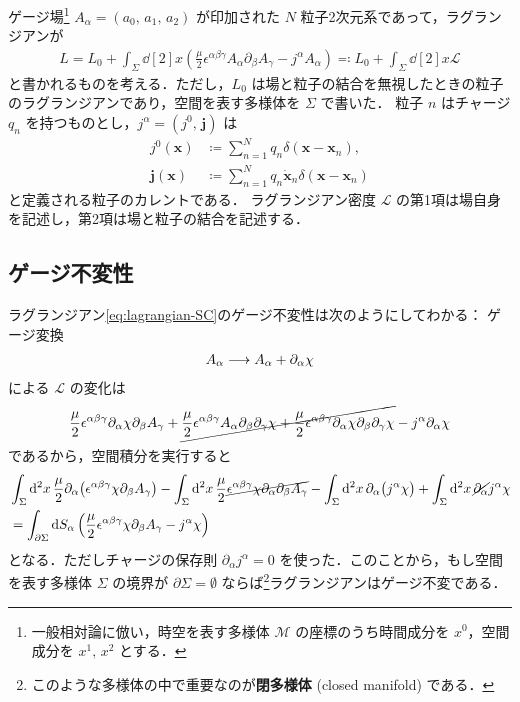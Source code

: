 \documentclass[TQFT_main]{subfiles}
\begin{document}
ゲージ場\footnote{一般相対論に倣い，時空を表す多様体 $\mathcal{M}$ の座標のうち時間成分を $x^0$，空間成分を $x^1,\, x^2$ とする．} $A_\alpha = (a_0,\, a_1,\, a_2)$ が印加された $N$ 粒子2次元系であって，ラグランジアンが
\begin{align}
    \label{eq:lagrangian-SC}
    L = L_0 + \int_\Sigma \dd[2]{x} \left( \frac{\mu}{2} \epsilon^{\alpha\beta\gamma} A_{\alpha} \partial_\beta A_\gamma -  j^\alpha A_\alpha \right) \eqqcolon L_0 + \int_{\Sigma} \dd[2]{x} \mathcal{L}
\end{align}
と書かれるものを考える．ただし，$L_0$ は場と粒子の結合を無視したときの粒子のラグランジアンであり，空間を表す多様体を $\Sigma$ で書いた．
粒子 $n$ はチャージ $q_n$ を持つものとし，$j^\alpha = (j^0,\, \bm{j})$ は
\begin{align}
    j^0(\bm{x}) &\coloneqq \sum_{n = 1}^N q_n \delta (\bm{x} - \bm{x}_n), \\
    \bm{j}(\bm{x}) &\coloneqq \sum_{n = 1}^N q_n \dot{\bm{x}}_n\delta (\bm{x} - \bm{x}_n)
\end{align}
と定義される粒子のカレントである．
ラグランジアン密度 $\mathcal{L}$ の第1項は場自身を記述し，第2項は場と粒子の結合を記述する．

\subsection{ゲージ不変性}

ラグランジアン\eqref{eq:lagrangian-SC}のゲージ不変性は次のようにしてわかる：
ゲージ変換
\begin{align}
    A_\alpha \longrightarrow A_\alpha + \partial_\alpha \chi
\end{align}
による $\mathcal{L}$ の変化は
\begin{align}
    \frac{\mu}{2} \epsilon^{\alpha\beta\gamma} \partial_{\alpha}\chi \partial_\beta A_\gamma + \cancel{\frac{\mu}{2} \epsilon^{\alpha\beta\gamma} A_\alpha\partial_\beta \partial_\gamma \chi + \frac{\mu}{2} \epsilon^{\alpha\beta\gamma} \partial_{\alpha}\chi \partial_\beta \partial_\gamma \chi} 
    -  j^\alpha \partial_\alpha \chi
\end{align}
であるから，空間積分を実行すると
\begin{align}
    &\int_{\Sigma} \dd[2]{x} \frac{\mu}{2} \partial_\alpha \bigl( \epsilon^{\alpha\beta\gamma} \chi \partial_\beta A_\gamma \bigr) - \int_{\Sigma} \dd[2]{x} \frac{\mu}{2} \cancel{\epsilon^{\alpha\beta\gamma} \chi \partial_\alpha\partial_\beta A_\gamma }
    - \int_{\Sigma} \dd[2]{x} \partial_\alpha \bigl( j^\alpha \chi \bigr) + \int_{\Sigma} \dd[2]{x} \cancel{\partial_\alpha} j^\alpha \chi \\
    &= \int_{\partial \Sigma} \dd S_\alpha \left(\frac{\mu}{2} \epsilon^{\alpha\beta\gamma} \chi \partial_\beta A_\gamma - j^\alpha \chi \right)
\end{align}
となる．ただしチャージの保存則 $\partial_\alpha j^\alpha = 0$ を使った．このことから，もし空間を表す多様体 $\Sigma$ の境界が $\partial \Sigma = \emptyset$ ならば\footnote{このような多様体の中で重要なのが\textbf{閉多様体} (closed manifold) である．}ラグランジアンはゲージ不変である．
\end{document}
